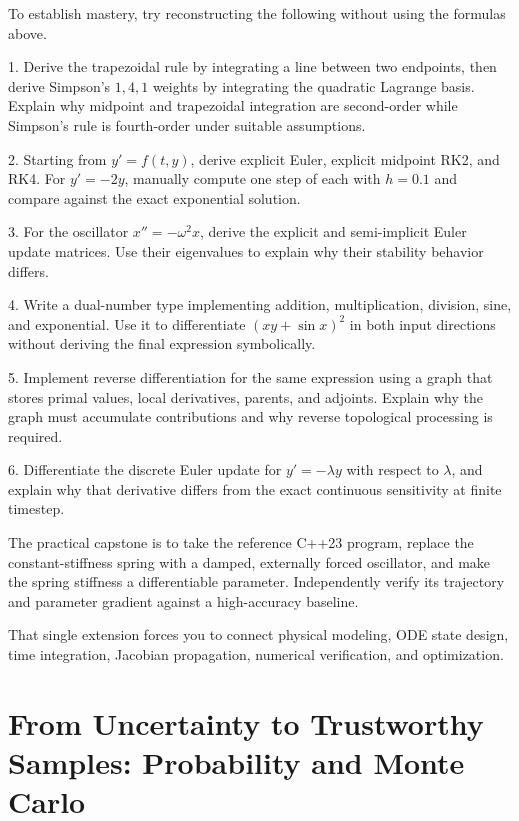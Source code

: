 \hypertarget{02-foundations-ii-ch022-reconstruction-challenges}{}

To establish mastery, try reconstructing the following without using the formulas above.

1. Derive the trapezoidal rule by integrating a line between two endpoints, then derive Simpson's \(1,4,1\) weights by integrating the quadratic Lagrange basis. Explain why midpoint and trapezoidal integration are second-order while Simpson's rule is fourth-order under suitable assumptions.

2. Starting from \(y'=f(t,y)\), derive explicit Euler, explicit midpoint RK2, and RK4. For \(y'=-2y\), manually compute one step of each with \(h=0.1\) and compare against the exact exponential solution.

3. For the oscillator \(x''=-\omega^2x\), derive the explicit and semi-implicit Euler update matrices. Use their eigenvalues to explain why their stability behavior differs.

4. Write a dual-number type implementing addition, multiplication, division, sine, and exponential. Use it to differentiate \((xy+\sin x)^2\) in both input directions without deriving the final expression symbolically.

5. Implement reverse differentiation for the same expression using a graph that stores primal values, local derivatives, parents, and adjoints. Explain why the graph must accumulate contributions and why reverse topological processing is required.

6. Differentiate the discrete Euler update for \(y'=-\lambda y\) with respect to \(\lambda\), and explain why that derivative differs from the exact continuous sensitivity at finite timestep.

The practical capstone is to take the reference C++23 program, replace the constant-stiffness spring with a damped, externally forced oscillator, and make the spring stiffness a differentiable parameter. Independently verify its trajectory and parameter gradient against a high-accuracy baseline.

That single extension forces you to connect physical modeling, ODE state design, time integration, Jacobian propagation, numerical verification, and optimization.

\section{From Uncertainty to Trustworthy Samples: Probability and Monte Carlo}\label{02-foundations-ii-ch022-from-uncertainty-to-trustworthy-samples-probability-and-monte-carlo}

